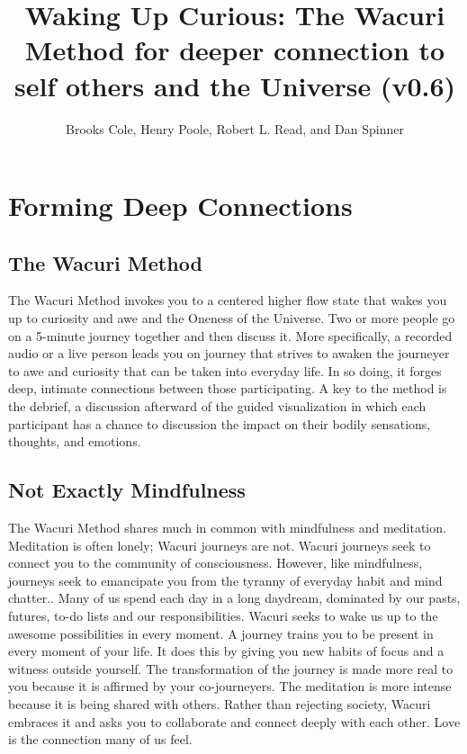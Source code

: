 \documentclass[12pt]{book}
\begin{document}
\title{Waking Up Curious: The Wacuri Method for deeper connection to self others and the Universe (v0.6)}

\author{Brooks Cole, Henry Poole, Robert L. Read, and Dan Spinner}
\date{ }

\maketitle
\tableofcontents


\chapter{Forming Deep Connections}

\section{The Wacuri Method}

The Wacuri Method invokes  you  to a centered higher flow state that wakes you up to curiosity and awe and the Oneness of the Universe. Two or more people go on a 5-minute journey together and then discuss it. More specifically,  a recorded audio or a live person leads you on  journey that strives to awaken the journeyer to awe and curiosity that can be taken into everyday life. In so doing, it forges deep, intimate connections between those participating. A key to the method is the debrief, a discussion afterward of the guided visualization in which each participant has a chance to discussion the impact on their bodily sensations, thoughts, and emotions.


\section{Not Exactly Mindfulness}

The Wacuri Method shares much in common with mindfulness and meditation. Meditation is often lonely; Wacuri journeys are not. Wacuri journeys seek to connect you to the community of consciousness. However, like mindfulness, journeys seek to emancipate you from the tyranny of everyday habit and mind chatter.. Many of us spend each day in a long daydream, dominated by our pasts, futures, to-do lists and our responsibilities. Wacuri seeks to wake us up to the awesome possibilities in every moment. A journey trains you to be present in every moment of your life. It does this by giving you new habits of focus and a witness outside yourself. The transformation of the journey is made more real to you because it is affirmed by your co-journeyers. The meditation is more intense because it is being shared with others. Rather than rejecting society, Wacuri embraces it and asks you to collaborate  and connect deeply with each other. Love is	 the connection many of us feel.
\end{document}
